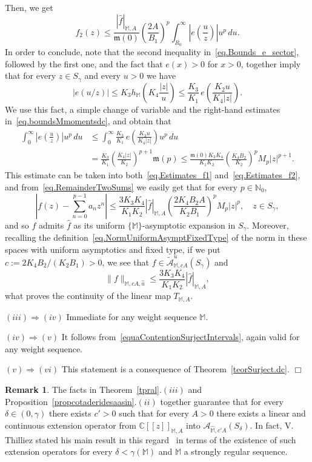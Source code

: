 \documentclass[11pt,a4paper]{article}
\theoremstyle{plain}
\theoremstyle{definition}
\newtheorem{rema}[theo]{Remark}
\newenvironment{proof1}{\medskip\par\noindent{\bf Proof.}}{\hfill $\Box$
\medskip\par}
\newcommand{\N}{\mathbb{N}}
\newcommand{\C}{\mathbb{C}}
\newcommand{\M}{\mathbb{M}}
\newcommand{\hM}{\widehat{\M}}
\newcommand{\mo}{\mathfrak{m}}
\def\ga{\gamma}
\begin{document}
\begin{proof1}
Then, we get
\begin{equation}\label{eq.Estimates_f2}
f_2(z)\le \frac{|\widehat{f}|_{\M,A}}{\mo(0)} \left(\frac{2A}{B_1}\right)^p \int_{R_0}^{\infty}\left|e \left(\frac{u}{z}\right) \right|u^{p}\,du.
\end{equation}
In order to conclude, note that the second inequality in~\eqref{eq.Bounds_e_sector}, followed by the first one, and the fact that $e(x)>0$ for $x>0$, together imply that for every $z\in S_{\ga}$ and every $u>0$ we have
$$
|e(u/z)|\le K_3h_{\M}\left(K_4\frac{|z|}{u}\right)\le
\frac{K_3}{K_1}\,e\left(\frac{K_2u}{K_4|z|}\right).
$$
We use this fact, a simple change of variable and the right-hand estimates in~\eqref{eq.boundsMmomentsdc}, and obtain that
\begin{align*}
\int_{0}^{\infty}\left|e \left(\frac{u}{z}\right) \right|u^{p}\,du
&\le
\int_{0}^{\infty}\frac{K_3}{K_1}\,e\left(\frac{K_2u}{K_4|z|}\right) u^{p}\,du\\
&=\frac{K_3}{K_1}\left(\frac{K_4|z|}{K_2}\right)^{p+1}\mo(p)
\le \frac{\mo(0)K_3K_4}{K_1K_2}\left(\frac{K_4B_2}{K_2}\right)^{p}M_p|z|^{p+1}.
\end{align*}
This estimate can be taken into both~\eqref{eq.Estimates_f1} and~\eqref{eq.Estimates_f2}, and from~\eqref{eq.RemainderTwoSums} we easily get that for every $p\in\N_0$,
$$
\left|f(z)-\sum_{n=0}^{p-1}a_nz^n\right|\le \frac{3K_3K_4}{K_1K_2}|\widehat{f}|_{\M,A} \left(\frac{2K_4B_2A}{K_2B_1}\right)^pM_p|z|^p,\quad z\in S_{\ga},
$$
and so $f$ admits $\widehat{f}$ as its uniform $\{\M\}$-asymptotic expansion in $S_{\ga}$. Moreover, recalling the definition~\eqref{eq.NormUniformAsymptFixedType} of the norm in these spaces with uniform asymptotics and fixed type, if we put $c:=2K_4B_2/(K_2B_1)>0$, we see that $f\in\widetilde{\mathcal{A}}^u_{\M,cA}(S_{\ga})$ and
$$
\|f\|_{\M,cA,\overset{\sim}{u}}\le \frac{3K_3K_4}{K_1K_2}|\widehat{f}|_{\M,A},
$$
what proves the continuity of the linear map $T_{\M,A}$.

$(iii)\Rightarrow (iv)$ Immediate for any weight sequence $\M$.

$(iv)\Rightarrow (v)$ It follows from~\eqref{equaContentionSurjectIntervals}, again valid for any weight sequence.

$(v)\Rightarrow (vi)$ This statement is a consequence of Theorem~\ref{teorSurject.dc}.
\end{proof1}

\begin{rema}
The facts in Theorem~\ref{tpral}.$(iii)$ and Proposition~\ref{propcotaderidesaasin}.$(ii)$ together guarantee that for every $\delta\in(0,\ga)$ there exists $c'>0$ such that for every $A>0$ there exists a linear and continuous extension operator from $\C[[z]]_{\M,A}$ into $\mathcal{A}_{\hM,c'A}(S_{\delta})$. In fact, V. Thilliez stated his main result in this regard~\cite[Th.~3.2.1]{Thilliez03} in terms of the existence of such extension operators for every $\delta<\ga(\M)$ and $\M$ a strongly regular sequence.
\end{rema}
\end{document}
